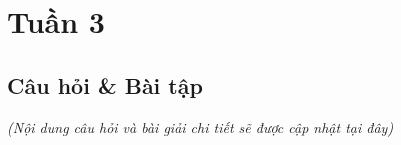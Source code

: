 \section{Tuần 3}
\label{sec:week3}

\subsection{Câu hỏi \& Bài tập}
\textit{(Nội dung câu hỏi và bài giải chi tiết sẽ được cập nhật tại đây)}
